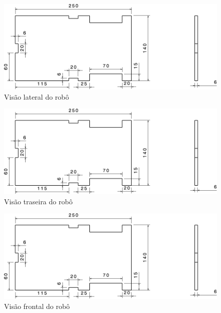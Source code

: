 \begin{figure}[htb]
  \caption{\label{fig:structure-side} Visão lateral do robô}

  \begin{center}
    \includegraphics[scale=0.525,page=2]{../img/structure.pdf}
  \end{center}

\end{figure}

\begin{figure}[htb]
  \caption{\label{fig:structure-back} Visão traseira do robô}

  \begin{center}
    \includegraphics[scale=0.525,page=3]{../img/structure.pdf}
  \end{center}

\end{figure}

\begin{figure}[htb]
  \caption{\label{fig:structure-front} Visão frontal do robô}

  \begin{center}
    \includegraphics[scale=0.525,page=4]{../img/structure.pdf}
  \end{center}

\end{figure}

